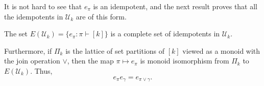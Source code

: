 It is not hard to see that $e_\pi$ is an idempotent, and the
next result proves that all the idempotents in $\mathcal{U}_k$
are of this form.

\begin{lemma} \label{lem:idempotents}
The set $E(\mathcal{U}_k) = \{e_\pi : \pi \vdash [k] \}$ is a complete set of idempotents in $\mathcal{U}_k$.

Furthermore, if $\Pi_k$ is the lattice of set partitions of $[k]$ viewed as a monoid with the join operation $\vee$,
then the map $\pi \mapsto e_\pi$ is monoid isomorphism from $\Pi_k$ to $E(\mathcal{U}_k)$. Thus,
\begin{equation*}
    e_\pi e_\gamma = e_{\pi \vee \gamma}.
\end{equation*}
\end{lemma}

